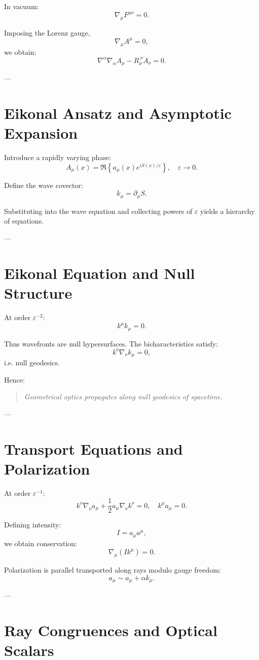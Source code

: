 \documentclass[12pt]{article}
\begin{document}
In vacuum:
\[
\nabla_\mu F^{\mu\nu} = 0.
\]

Imposing the Lorenz gauge,
\[
\nabla_\mu A^\mu = 0,
\]
we obtain:
\[
\nabla^\alpha \nabla_\alpha A_\mu - R_{\mu}^{\ \nu} A_\nu = 0.
\]

---

\section{Eikonal Ansatz and Asymptotic Expansion}

Introduce a rapidly varying phase:
\[
A_\mu(x) = \Re\left\{ a_\mu(x) e^{i S(x)/\varepsilon} \right\},
\quad \varepsilon \to 0.
\]

Define the wave covector:
\[
k_\mu = \partial_\mu S.
\]

Substituting into the wave equation and collecting powers of $\varepsilon$ yields a hierarchy of equations.

---

\section{Eikonal Equation and Null Structure}

At order $\varepsilon^{-2}$:
\[
k^\mu k_\mu = 0.
\]

Thus wavefronts are null hypersurfaces. The bicharacteristics satisfy:
\[
k^\nu \nabla_\nu k_\mu = 0,
\]
i.e. null geodesics.

Hence:

\begin{quote}
\textit{Geometrical optics propagates along null geodesics of spacetime.}
\end{quote}

---

\section{Transport Equations and Polarization}

At order $\varepsilon^{-1}$:
\[
k^\nu \nabla_\nu a_\mu + \frac{1}{2} a_\mu \nabla_\nu k^\nu = 0,
\quad
k^\mu a_\mu = 0.
\]

Defining intensity:
\[
I = a_\mu a^\mu,
\]
we obtain conservation:
\[
\nabla_\mu (I k^\mu) = 0.
\]

Polarization is parallel transported along rays modulo gauge freedom:
\[
a_\mu \sim a_\mu + \alpha k_\mu.
\]

---

\section{Ray Congruences and Optical Scalars}
\end{document}
